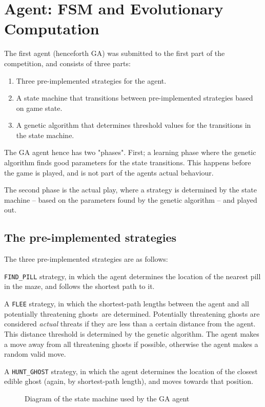 \section{Agent: FSM and Evolutionary Computation}
\label{sec:GA}

The first agent (henceforth GA) was submitted to the first part of the competition, and consists of three parts:

\begin{enumerate}
\item Three pre-implemented strategies for the agent.
\item A state machine that transitions between pre-implemented strategies based
	on game state.
\item A genetic algorithm that determines threshold values for the transitions
	in the state machine.
\end{enumerate}

The GA agent hence has two "phases". First; a learning phase where the genetic
algorithm finds good parameters for the state transitions. This happens before
the game is played, and is not part of the agents actual behaviour.

The second phase is the actual play, where a strategy is determined by the state
machine -- based on the parameters found by the genetic algorithm -- and played out.
\subsection{The pre-implemented strategies}
The three pre-implemented strategies are as follows:

 \texttt{FIND\_PILL} strategy, in which the agent determines the location of the
nearest pill in the maze, and follows the shortest path to it.

A \texttt{FLEE} strategy, in which the shortest-path lengths between the agent
and all potentially threatening ghosts\footnotemark\ are determined.
Potentially threatening ghosts are considered \textit{actual} threats if they
are less than a certain distance from the agent. This distance threshold is
determined by the genetic algorithm. The agent makes a move away from all
threatening ghosts if possible, otherwise the agent makes a random valid move.

A \texttt{HUNT\_GHOST} strategy, in which the agent determines the location of
the closest edible ghost (again, by shortest-path length), and moves towards
that position.

\begin{figure}[hbtp]

\caption{Diagram of the state machine used by the GA agent}
\end{figure}

